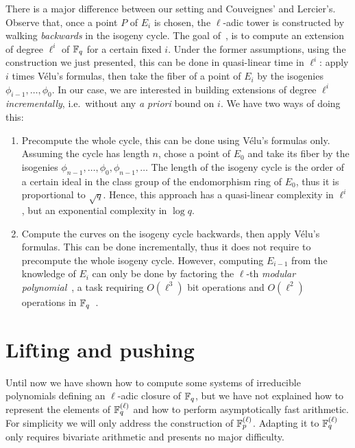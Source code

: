 \documentclass{sig-alternate}
\begin{document}
\begin{remark}
  \label{rk:cycle}
  There is a major difference between our setting and Couveignes' and
  Lercier's. Observe that, once a point $P$ of $E_i$ is chosen, the
  $\ell$-adic tower is constructed by walking \emph{backwards} in the
  isogeny cycle. The goal of~\cite{couveignes+lercier11}, is to
  compute an extension of degree $\ell^i$ of $\mathbb{F}_q$ for a certain
  fixed $i$. Under the former assumptions, using the construction we
  just presented, this can be done in quasi-linear time in $\ell^i$:
  apply $i$ times Vélu's formulas, then take the fiber of a point of
  $E_i$ by the isogenies $\phi_{i-1}, \ldots, \phi_0$. In our case, we
  are interested in building extensions of degree $\ell^i$
  \emph{incrementally}, i.e.\ without any \emph{a priori} bound on
  $i$. We have two ways of doing this:
  \begin{enumerate}
  \item Precompute the whole cycle, this can be done using Vélu's
    formulas only. Assuming the cycle has length $n$, chose a point of
    $E_0$ and take its fiber by the isogenies $\phi_{n-1}, \ldots,
    \phi_0, \phi_{n-1}, \ldots$ The length of the isogeny cycle is the
    order of a certain ideal in the class group of the endomorphism
    ring of $E_0$, thus it is proportional to $\sqrt{q}$. Hence, this
    approach has a quasi-linear complexity in $\ell^i$, but an
    exponential complexity in $\log q$.
  \item Compute the curves on the isogeny cycle backwards, then apply
    Vélu's formulas. This can be done incrementally, thus it does not
    require to precompute the whole isogeny cycle. However, computing
    $E_{i-1}$ from the knowledge of $E_i$ can only be done by
    factoring the $\ell$-th \emph{modular polynomial}~\cite{schoof95},
    a task requiring $O(\ell^3)$ bit operations and $O(\ell^2)$
    operations in $\mathbb{F}_q$~\cite{sutherland10:modpol}.
  \end{enumerate}
\end{remark}


\section{Lifting and pushing}
\label{sec:lift-push}

Until now we have shown how to compute some systems of irreducible
polynomials defining an $\ell$-adic closure of $\mathbb{F}_q$, but we have not
explained how to represent the elements of $\mathbb{F}_q^{(\ell)}$ and how to
perform asymptotically fast arithmetic. For simplicity we will only
address the construction of $\mathbb{F}_p^{(\ell)}$. Adapting it to
$\mathbb{F}_q^{(\ell)}$ only requires bivariate arithmetic and presents no
major difficulty.
\end{document}
